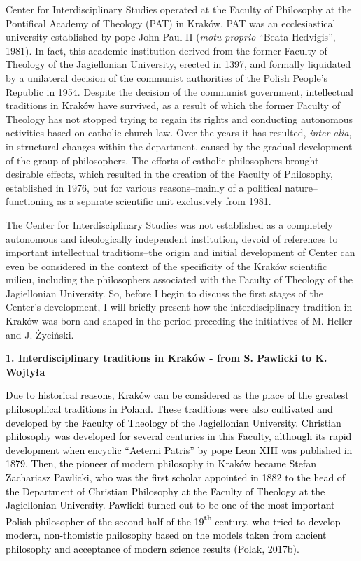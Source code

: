 \documentclass[a4paper]{article}
\begin{document}
Center for Interdisciplinary Studies operated at the Faculty of Philosophy at the Pontifical Academy of Theology (PAT)
in Kraków. PAT was an ecclesiastical university established by pope John Paul II (\textit{motu proprio} “Beata
Hedvigis”, 1981). In fact, this academic institution derived from the former Faculty of Theology of the Jagiellonian
University, erected in 1397, and formally liquidated by a unilateral decision of the communist authorities of the
Polish People’s Republic in 1954. Despite the decision of the communist government, intellectual traditions in Kraków
have survived, as a result of which the former Faculty of Theology has not stopped trying to regain its rights and
conducting autonomous activities based on catholic church law. Over the years it has resulted, \textit{inter alia}, in
structural changes within the department, caused by the gradual development of the group of philosophers. The efforts
of catholic philosophers brought desirable effects, which resulted in the creation of the Faculty of Philosophy,
established in 1976, but for various reasons–mainly of a political nature–functioning as a separate scientific unit
exclusively from 1981.

The Center for Interdisciplinary Studies was not established as a completely autonomous and ideologically independent
institution, devoid of references to important intellectual traditions–the origin and initial development of Center can
even be considered in the context of the specificity of the Kraków scientific milieu, including the philosophers
associated with the Faculty of Theology of the Jagiellonian University. So, before I begin to discuss the first stages
of the Center’s development, I will briefly present how the interdisciplinary tradition in Kraków was born and shaped
in the period preceding the initiatives of M. Heller and J. Życiński.

{\bfseries
1. Interdisciplinary traditions in Kraków - from S. Pawlicki to K. Wojtyła}

\textcolor{black}{Due to historical reasons, Kraków can be considered as the place of the greatest philosophical
traditions in Poland. These traditions were also cultivated and developed by the Faculty of Theology of the
Jagiellonian University. Christian philosophy was developed for several centuries in this Faculty, although its rapid
development when encyclic “Aeterni Patris” by pope Leon XIII was published in 1879. Then, the pioneer of modern
philosophy in Kraków became Stefan Zachariasz Pawlicki, who was the first scholar appointed in 1882 to the head of the
Department of Christian Philosophy at the Faculty of Theology at the Jagiellonian University. Pawlicki turned out to be
one of the most important Polish philosopher of the second half of the
19}\textcolor{black}{\textsuperscript{th}}\textcolor{black}{ century, who tried to develop modern, non-thomistic
philosophy based on the models taken from ancient philosophy and acceptance of modern science results
}\label{ref:RNDAF5eF7rVZ2}\textcolor{black}{(Polak, 2017b)}\textcolor{black}{.}
\end{document}
